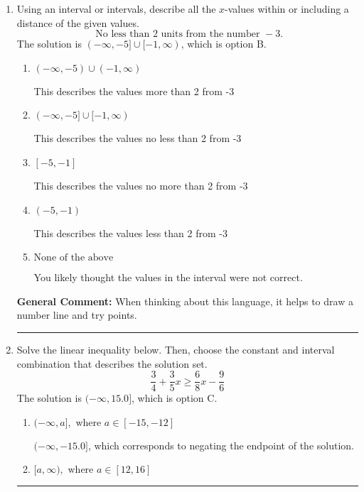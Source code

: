 \documentclass{extbook}[14pt]
\newcommand{\litem}[1]{\item #1

\rule{\textwidth}{0.4pt}}
\begin{document}
\begin{enumerate}
{\begin{enumerate}[label=\Alph*.]
This describes the values no less than 3 from -3
\item \( (-6, 0) \)

This describes the values less than 3 from -3
\item \( [-6, 0] \)

This describes the values no more than 3 from -3
\item \( \text{None of the above} \)

You likely thought the values in the interval were not correct.
\end{enumerate}

\textbf{General Comment:} When thinking about this language, it helps to draw a number line and try points.
}
\litem{
Using an interval or intervals, describe all the $x$-values within or including a distance of the given values.
\[ \text{ No less than } 2 \text{ units from the number } -3. \]The solution is \( (-\infty, -5] \cup [-1, \infty) \), which is option B.\begin{enumerate}[label=\Alph*.]
\item \( (-\infty, -5) \cup (-1, \infty) \)

This describes the values more than 2 from -3
\item \( (-\infty, -5] \cup [-1, \infty) \)

This describes the values no less than 2 from -3
\item \( [-5, -1] \)

This describes the values no more than 2 from -3
\item \( (-5, -1) \)

This describes the values less than 2 from -3
\item \( \text{None of the above} \)

You likely thought the values in the interval were not correct.
\end{enumerate}

\textbf{General Comment:} When thinking about this language, it helps to draw a number line and try points.
}
\litem{
Solve the linear inequality below. Then, choose the constant and interval combination that describes the solution set.
\[ \frac{3}{4} + \frac{3}{5} x \geq \frac{6}{8} x - \frac{9}{6} \]The solution is \( (-\infty, 15.0] \), which is option C.\begin{enumerate}[label=\Alph*.]
\item \( (-\infty, a], \text{ where } a \in [-15, -12] \)

 $(-\infty, -15.0]$, which corresponds to negating the endpoint of the solution.
\item \( [a, \infty), \text{ where } a \in [12, 16] \)


\end{enumerate}}
\end{enumerate}
\end{document}
